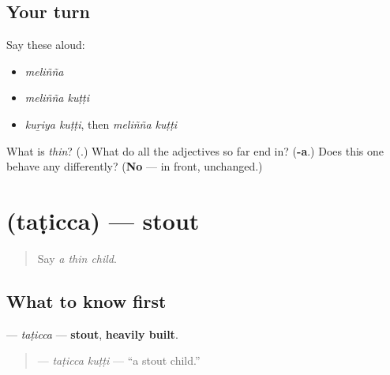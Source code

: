 \subsection*{Your turn}
Say these aloud:

\begin{itemize}
\raggedright
  \item \emph{meliñña}
  \item \emph{meliñña kuṭṭi}
  \item \emph{kuṟiya kuṭṭi}, then \emph{meliñña kuṭṭi}
\end{itemize}

\begin{tcolorbox}[breakable,colback=teal!4,colframe=teal!35!black,title={Before you move on}]
What is \emph{thin}? (\textbf{}.) What do all the adjectives so far end in? (\textbf{-a}.) Does this one behave any differently? (\textbf{No} — in front, unchanged.)
\end{tcolorbox}
\section[\texorpdfstring{\ml{തടിച്ച} (taṭicca)}{തടിച്ച (taṭicca)}]{ (taṭicca) — stout}

\label{lesson:ML-C101-thadicha}



\begin{quote}
Say \emph{a thin child}.
\end{quote}

\subsection*{What to know first}
\textbf{} — \emph{taṭicca} — \textbf{stout}, \textbf{heavily built}.

\begin{quote}
\textbf{ } — \emph{taṭicca kuṭṭi} — \textquotedblleft{}a stout child.\textquotedblright{}
\end{quote}

